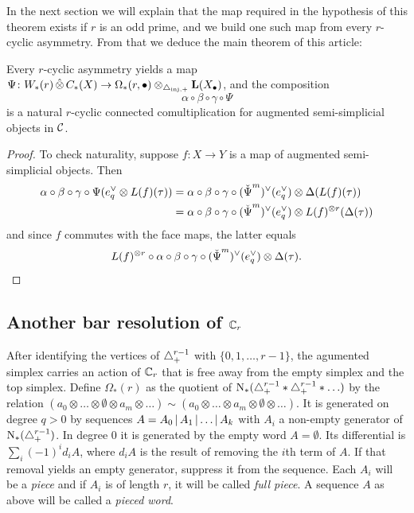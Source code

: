 In the next section we will explain that the map required in the hypothesis of this theorem exists if $r$ is an odd prime, and we build one such map from every $r$-cyclic asymmetry. From that we deduce the main theorem of this article:
\begin{theorem}\label{thm2:mainthm} Every $r$-cyclic asymmetry yields a map $\Psi\colon W_*(r)\operatorname{\hat{\otimes}} C_*(X)\to \Omega_*(r,\bullet)\otimes_{\triangle_{\mathrm{inj},+}} \operatorname{\mathbf{L}}(X_\bullet)$, and the composition
	\[ \alpha\circ\beta\circ\gamma\circ \Psi
	\]
	is a natural $r$-cyclic connected comultiplication for augmented semi-simplicial objects in $\mathcal{C}$.
\end{theorem}

\begin{proof}
	To check naturality, suppose $f\colon X\to Y$ is a map of augmented semi-simplicial objects. Then
	\begin{align*}
		\alpha\circ\beta\circ\gamma\circ \Psi(e_q^\vee\otimes L(f)(\tau))
		&= \alpha\circ\beta\circ\gamma\circ(\operatorname{\check{\Psi}}^m)^\vee(e_q^\vee)\otimes \Delta(L(f)(\tau)) \\
		&= \alpha\circ\beta\circ\gamma\circ(\operatorname{\check{\Psi}}^m)^\vee(e_q^\vee)\otimes L(f)^{\otimes r}(\Delta(\tau))
	\end{align*}
	and since $f$ commutes with the face maps, the latter equals
	\[
	L(f)^{\otimes r}\circ \alpha\circ\beta\circ\gamma\circ(\operatorname{\check{\Psi}}^m)^\vee(e_q^\vee)\otimes \Delta(\tau).\qedhere
	\]
\end{proof}

\subsection{Another bar resolution of $\mathbb{C}_r$}

After identifying the vertices of $\triangle_{+}^{r-1}$ with $\{0,1,\ldots,r-1\}$, the agumented simplex carries an action of $\mathbb{C}_r$ that is free away from the empty simplex and the top simplex. Define $\Omega_*(r)$ as the quotient of $\operatorname{N}_*(\triangle_{+}^{r-1}*\triangle_{+}^{r-1}*\ldots)$ by the relation $(a_0\otimes \ldots \otimes \emptyset \otimes a_m\otimes \ldots) \sim (a_0\otimes \ldots \otimes a_m \otimes \emptyset \otimes \ldots)$. It is generated on degree $q>0$ by sequences $A = A_0\operatorname{|} A_1\operatorname{|}\ldots \operatorname{|} A_k$ with $A_i$ a non-empty generator of $\operatorname{N}_*(\triangle_{+}^{r-1})$. In degree $0$ it is generated by the empty word $A=\emptyset$. Its differential is $\sum_{i} (-1)^i d_i A$, where $d_iA$ is the result of removing the $i$th term of $A$. If that removal yields an empty generator, suppress it from the sequence. Each $A_i$ will be a \emph{piece} and if $A_i$ is of length $r$, it will be called \emph{full piece}. A sequence $A$ as above will be called a \emph{pieced word}.

